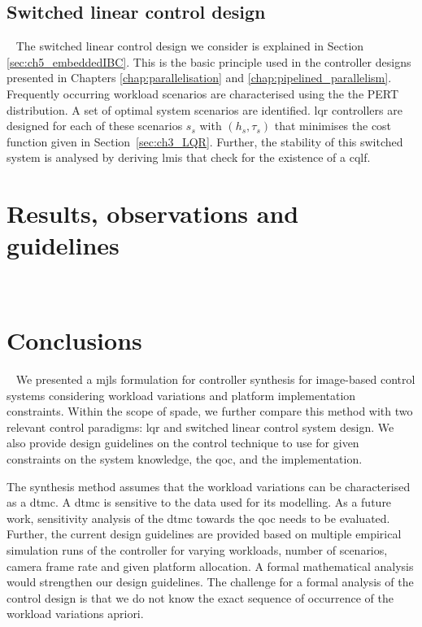 \subsection{Switched linear control design}~\label{sec:ch3_SPADe}
The switched linear control design we consider is explained in Section \ref{sec:ch5_embeddedIBC}. This is the basic principle used in the controller designs presented in Chapters \ref{chap:parallelisation} and \ref{chap:pipelined_parallelism}. Frequently occurring workload scenarios are characterised using the the PERT distribution. A set of optimal system scenarios are identified. \gls{lqr} controllers are designed for each of these scenarios $s_s$ with $(h_s,\tau_s)$ that minimises the cost function given in Section~\ref{sec:ch3_LQR}. Further, the stability of this switched system is analysed by deriving \glspl{lmi} that check for the existence of a \gls{cqlf}.

\section{Results, observations and guidelines}~\label{sec:ch3_Results}

\section{Conclusions}~\label{sec:ch3_Conclusion}
We presented a \gls{mjls} formulation for controller synthesis for image-based control systems considering workload variations and platform implementation constraints.
Within the scope of \gls{spade}, we further compare this method with two relevant control paradigms: \gls{lqr} and switched linear control system design. 
We also provide design guidelines on the control technique to use for given constraints on the system knowledge, the \gls{qoc}, and the implementation.

The synthesis method assumes that the workload variations can be characterised as a \gls{dtmc}. A \gls{dtmc} is sensitive to the data used for its modelling. As a future work, sensitivity analysis of the \gls{dtmc} towards the \gls{qoc} needs to be evaluated. 
Further, the current design guidelines are provided based on multiple empirical simulation runs of the controller for varying workloads, number of scenarios, camera frame rate and given platform allocation. A formal mathematical analysis would strengthen our design guidelines. The challenge for a formal analysis of the control design is that we do not know the exact sequence of occurrence of the workload variations apriori.
